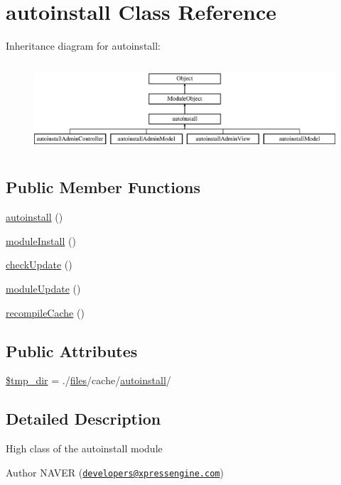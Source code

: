 \hypertarget{classautoinstall}{}\section{autoinstall Class Reference}
\label{classautoinstall}
Inheritance diagram for autoinstall\+:\begin{figure}[H]
\begin{center}
\leavevmode
\includegraphics[height=3.353293cm]{classautoinstall}
\end{center}
\end{figure}
\subsection*{Public Member Functions}
\begin{DoxyCompactItemize}
\item 
\hyperlink{classautoinstall_aa76d5fcbf6ac9450b810acefa4b85a51}{autoinstall} ()
\item 
\hyperlink{classautoinstall_ad783aa6031577dca5fdcc7f6ea61f452}{module\+Install} ()
\item 
\hyperlink{classautoinstall_a74f260b0d1254c8e4dbd69b532072a95}{check\+Update} ()
\item 
\hyperlink{classautoinstall_a856f1e61cac8e20ed0df58a6a10f61a8}{module\+Update} ()
\item 
\hyperlink{classautoinstall_a7455962a1f07ea4c4e28971fa8dde715}{recompile\+Cache} ()
\end{DoxyCompactItemize}
\subsection*{Public Attributes}
\begin{DoxyCompactItemize}
\item 
\hyperlink{classautoinstall_a157882a0b8cc81818aa516880f2ba5dc}{\$tmp\+\_\+dir} = \textquotesingle{}./\hyperlink{popup_8min_8js_a0742cac2750bccc2d88ac080fb9daa22}{files}/cache/\hyperlink{classautoinstall}{autoinstall}/\textquotesingle{}
\end{DoxyCompactItemize}


\subsection{Detailed Description}
High class of the autoinstall module \begin{DoxyAuthor}{Author}
N\+A\+V\+ER (\href{mailto:developers@xpressengine.com}{\tt developers@xpressengine.\+com}) 
\end{DoxyAuthor}


